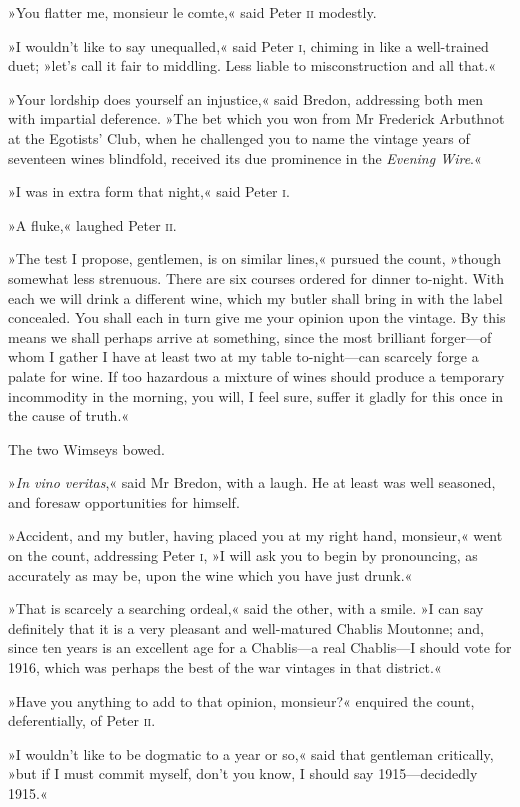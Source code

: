»You flatter me, monsieur le comte,« said Peter \textsc{ii} modestly.

»I wouldn't like to say unequalled,« said Peter \textsc{i}, chiming in like a well-trained duet; »let's call it fair to middling. Less liable to misconstruction and all that.«

»Your lordship does yourself an injustice,« said Bredon, addressing both men with impartial deference. »The bet which you won from Mr Frederick Arbuthnot at the Egotists' Club, when he challenged you to name the vintage years of seventeen wines blindfold, received its due prominence in the \textit{Evening Wire}.«

»I was in extra form that night,« said Peter \textsc{i}.

»A fluke,« laughed Peter \textsc{ii}.

»The test I propose, gentlemen, is on similar lines,« pursued the count, »though somewhat less strenuous. There are six courses ordered for dinner to-night. With each we will drink a different wine, which my butler shall bring in with the label concealed. You shall each in turn give me your opinion upon the vintage. By this means we shall perhaps arrive at something, since the most brilliant forger—of whom I gather I have at least two at my table to-night—can scarcely forge a palate for wine. If too hazardous a mixture of wines should produce a temporary incommodity in the morning, you will, I feel sure, suffer it gladly for this once in the cause of truth.«

The two Wimseys bowed.

»\textit{In vino veritas},« said Mr Bredon, with a laugh. He at least was well seasoned, and foresaw opportunities for himself.

»Accident, and my butler, having placed you at my right hand, monsieur,« went on the count, addressing Peter \textsc{i}, »I will ask you to begin by pronouncing, as accurately as may be, upon the wine which you have just drunk.«

»That is scarcely a searching ordeal,« said the other, with a smile. »I can say definitely that it is a very pleasant and well-matured Chablis Moutonne; and, since ten years is an excellent age for a Chablis—a real Chablis—I should vote for 1916, which was perhaps the best of the war vintages in that district.«

»Have you anything to add to that opinion, monsieur?« enquired the count, deferentially, of Peter \textsc{ii}.

»I wouldn't like to be dogmatic to a year or so,« said that gentleman critically, »but if I must commit myself, don't you know, I should say 1915—decidedly 1915.«

